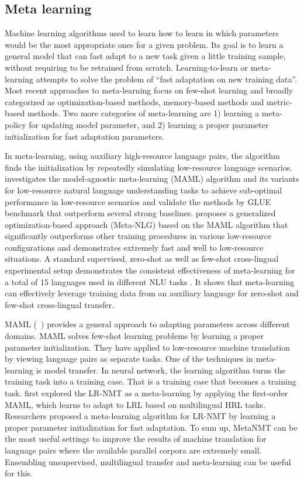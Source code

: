 \documentclass[manuscript,screen]{acmart}
\begin{document}
\subsection{Meta learning}
Machine learning algorithms used to learn how to learn in which parameters would be the most appropriate ones for a given problem. Its goal is to learn a general model that can fast adapt to a new task given a little training sample, without requiring to be retrained from scratch. Learning-to-learn or meta-learning attempts to solve the problem of ``fast adaptation on new training data''. 
Most recent approaches to meta-learning focus on few-shot learning and broadly categorized as optimization-based methods, memory-based methods and metric-based methods. Two more categories of meta-learning are 1) learning a meta-policy for updating model parameter, and 2) learning a proper parameter initialization for fast adaptation parameters. 

In meta-learning, using auxiliary high-resource language pairs, the algorithm finds the initialization by repeatedly simulating low-resource language scenarios. \citet{dou2019investigating} investigates the model-agnostic meta-learning (MAML) algorithm and its variants for low-resource natural language understanding tasks to achieve sub-optimal performance in low-resource scenarios and validate the methods by GLUE benchmark that outperform several strong baselines. \citet{mi2019meta} proposes a generalized optimization-based approach (Meta-NLG) based on the MAML algorithm that significantly outperforms other training procedures in various low-resource configurations and demonstrates extremely fast and well to low-resource situations. A standard supervised, zero-shot as well as few-shot cross-lingual experimental setup demonstrates the consistent effectiveness of meta-learning for a total of 15 languages used in different NLU tasks \citet{nooralahzadeh2020zero}. It shows that meta-learning can effectively leverage training data from an auxiliary language for zero-shot and few-shot cross-lingual transfer. 

MAML (~\citet{finn2017model}) provides a general approach to adapting parameters across different domains. MAML solves few-shot learning problems by learning a proper parameter initialization. They have applied to low-resource machine translation by viewing language pairs as separate tasks. One of the techniques in meta-learning is model transfer. In neural network, the learning algorithm turns the training task into a training case. That is a training case that becomes a training task. \citet{gu2018meta} first explored the LR-NMT as a meta-learning by applying the first-order MAML, which learns to adapt to LRL based on multilingual HRL tasks. Researchers proposed a meta-learning algorithm for LR-NMT by learning a proper parameter initialization for fast adaptation. To sum up, MetaNMT can be the most useful settings to improve the results of machine translation for language pairs where the available parallel corpora are extremely small. Ensembling unsupervised, multilingual transfer and meta-learning can be useful for this.
\end{document}
